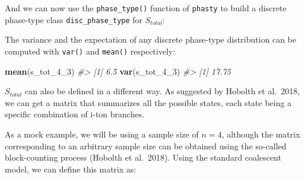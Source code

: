 \documentclass[]{article}
\newenvironment{Shaded}{\begin{snugshade}}{\end{snugshade}}
\newcommand{\CommentTok}[1]{\textcolor[rgb]{0.56,0.35,0.01}{\textit{#1}}}
\newcommand{\DecValTok}[1]{\textcolor[rgb]{0.00,0.00,0.81}{#1}}
\newcommand{\KeywordTok}[1]{\textcolor[rgb]{0.13,0.29,0.53}{\textbf{#1}}}
\newcommand{\NormalTok}[1]{#1}
\newcommand{\StringTok}[1]{\textcolor[rgb]{0.31,0.60,0.02}{#1}}
\begin{document}
And we can now use the \texttt{phase\_type()} function of
\texttt{phasty} to build a discrete phase-type class
\texttt{disc\_phase\_type} for \(S_{total}\):

\begin{Shaded}
\end{Shaded}

The variance and the expectation of any discrete phase-type distribution
can be computed with \texttt{var()} and \texttt{mean()} respectively:

\begin{Shaded}
\begin{Highlighting}[]
\KeywordTok{mean}\NormalTok{(s_tot_}\DecValTok{4}\NormalTok{_}\DecValTok{3}\NormalTok{)}
\CommentTok{#> [1] 6.5}
\KeywordTok{var}\NormalTok{(s_tot_}\DecValTok{4}\NormalTok{_}\DecValTok{3}\NormalTok{)}
\CommentTok{#> [1] 17.75}
\end{Highlighting}
\end{Shaded}

\(S_{total}\) can also be defined in a different way. As suggested by
Hobolth et al.~2018, we can get a matrix that summarizes all the
possible states, each state being a specific combination of i-ton
branches.

As a mock example, we will be using a sample size of \(n=4\), although
the matrix corresponding to an arbitrary sample size can be obtained
using the so-called block-counting process (Hobolth et al.~2018). Using
the standard coalescent model, we can define this matrix as:
\end{document}
